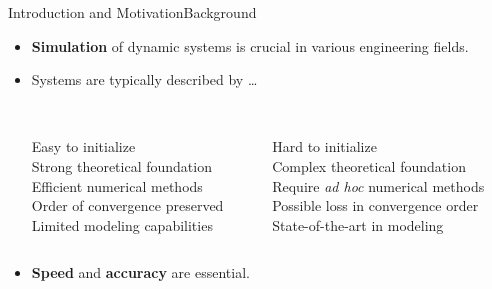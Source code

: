 

\begin{frame}{Introduction and Motivation}{Background}
  \begin{itemize}
    \item \textbf{Simulation} of dynamic systems is crucial in various engineering fields.
    \item Systems are typically described by \dots
    \vspace{1.0em}
    \begin{columns}
      \centering
      \begin{column}[t]{0.45\textwidth}
        \centering
         \\
        \centering\small
        \textcolor{mycolor5!95!black}{Easy to initialize} \\
        \textcolor{mycolor5!95!black}{Strong theoretical foundation} \\
        \textcolor{mycolor5!95!black}{Efficient numerical methods} \\
        \textcolor{mycolor5!95!black}{Order of convergence preserved} \\
        \textcolor{mycolor2!95!black}{Limited modeling capabilities} \\
      \end{column}
      \begin{column}[t]{0.45\textwidth}
        \centering
         \\
        \centering\small
        \textcolor{mycolor2!90!black}{Hard to initialize} \\
        \textcolor{mycolor3!90!black}{Complex theoretical foundation} \\
        \textcolor{mycolor3!90!black}{Require \emph{ad hoc} numerical methods} \\
        \textcolor{mycolor2!95!black}{Possible loss in convergence order} \\
        \textcolor{mycolor5!90!black}{State-of-the-art in modeling} \\
      \end{column}
    \end{columns}
    \vspace{1.0em}
    \item \textbf{Speed} and \textbf{accuracy} are essential.
  \end{itemize}
  \vspace{0.5em}
\end{frame}

